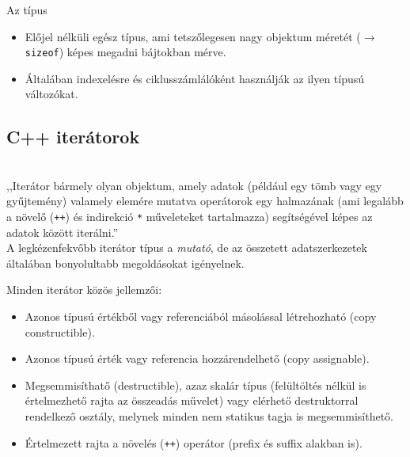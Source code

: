 \begin{frame}
    \begin{exampleblock}{}
        \scriptsize
        
    \end{exampleblock}
\end{frame}

\begin{frame}
    Az  típus
    \begin{itemize}
        \item Előjel nélküli egész típus, ami tetszőlegesen nagy objektum méretét ($\to$ \texttt{sizeof}) képes megadni bájtokban mérve.
        \item Általában indexelésre és ciklusszámlálóként használják az ilyen típusú változókat. 
    \end{itemize}
\end{frame}

\subsection{C++ iterátorok}

\begin{frame}
    \begin{description}[m]
        \item[C++ iterátorok] \hfill \\ ,,Iterátor bármely olyan objektum, amely adatok (például egy tömb vagy egy gyűjtemény) valamely elemére mutatva operátorok egy halmazának (ami legalább a növelő (\texttt{++}) és indirekció \texttt{*} műveleteket tartalmazza) segítségével képes az adatok között iterálni.'' \\
        A legkézenfekvőbb iterátor típus a \emph{mutató}, de az összetett adatszerkezetek általában bonyolultabb megoldásokat igényelnek.
    \end{description}
\end{frame}

\begin{frame}
    Minden iterátor közös jellemzői:
    \begin{itemize}
        \item Azonos típusú értékből vagy referenciából másolással létrehozható (copy constructible).
        \item Azonos típusú érték vagy referencia hozzárendelhető (copy assignable).
        \item Megsemmisíthatő (destructible), azaz skalár típus (felültöltés nélkül is értelmezhető rajta az összeadás művelet) vagy elérhető destruktorral rendelkező osztály, melynek minden nem statikus tagja is megsemmisíthető.
        \item Értelmezett rajta a növelés (\texttt{++}) operátor (prefix és suffix alakban is).
    \end{itemize}
\end{frame}

